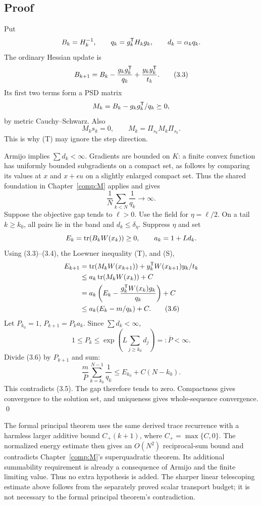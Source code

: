 \subsection{Proof}
Put
\[
 B_k=H_k^{-1},\qquad q_k=g_k^{\mathsf T} H_kg_k,\qquad
 d_k=\alpha_kq_k.
\]
The ordinary Hessian update is
\begin{equation}
 B_{k+1}=B_k-\frac{g_kg_k^{\mathsf T}}{q_k}+\frac{y_ky_k^{\mathsf T}}{t_k}. \tag{3.3}
\end{equation}
Its first two terms form a PSD matrix
\[
 M_k=B_k-g_kg_k^{\mathsf T}/q_k\succeq0,
\]
by metric Cauchy--Schwarz. Also
\begin{equation}
 M_ks_k=0,\qquad M_k=\Pi_{s_k}M_k\Pi_{s_k}. \tag{3.4}
\end{equation}
This is why (T) may ignore the step direction.

Armijo implies $\sum d_k<\infty$. Gradients are bounded on $K$: a finite convex function has uniformly bounded subgradients on a compact set, as follows by comparing its values at $x$ and $x+\epsilon u$ on a slightly enlarged compact set. Thus the shared foundation in Chapter~\ref{comp:M} applies and gives
\begin{equation}
 \frac1N\sum_{k<N}\frac1{q_k}\longrightarrow\infty. \tag{3.5}
\end{equation}
Suppose the objective gap tends to $\ell>0$. Use the field for $\eta=\ell/2$. On a tail $k\ge k_0$, all pairs lie in the band and $d_k\le\delta_\eta$. Suppress $\eta$ and set
\[
 E_k=\operatorname{tr}(B_kW(x_k))\ge0,\qquad a_k=1+L d_k.
\]
Using (3.3)--(3.4), the Loewner inequality (T), and (S),
\begin{align}
 E_{k+1}
 &=\operatorname{tr}(M_kW(x_{k+1}))+y_k^{\mathsf T} W(x_{k+1})y_k/t_k\notag\\
 &\le a_k\operatorname{tr}(M_kW(x_k))+C\notag\\
 &=a_k\left(E_k-\frac{g_k^{\mathsf T} W(x_k)g_k}{q_k}\right)+C\notag\\
 &\le a_k(E_k-m/q_k)+C. \tag{3.6}
\end{align}
Let $P_{k_0}=1$, $P_{k+1}=P_ka_k$. Since $\sum d_k<\infty$,
\[
 1\le P_k\le \exp\left(L\sum_{j\ge k_0}d_j\right)=:\overline P<\infty.
\]
Divide (3.6) by $P_{k+1}$ and sum:
\[
 \frac m{\overline P}\sum_{k=k_0}^{N-1}\frac1{q_k}
 \le E_{k_0}+C(N-k_0).
\]
This contradicts (3.5). The gap therefore tends to zero. Compactness gives convergence to the solution set, and uniqueness gives whole-sequence convergence. \qed

The formal principal theorem uses the same derived trace recurrence with a harmless larger additive bound $C_+(k+1)$, where $C_+=\max\{C,0\}$. The normalized energy estimate then gives an $O(N^2)$ reciprocal-sum bound and contradicts Chapter~\ref{comp:M}'s superquadratic theorem. Its additional summability requirement is already a consequence of Armijo and the finite limiting value. Thus no extra hypothesis is added. The sharper linear telescoping estimate above follows from the separately proved scalar transport budget; it is not necessary to the formal principal theorem's contradiction.

